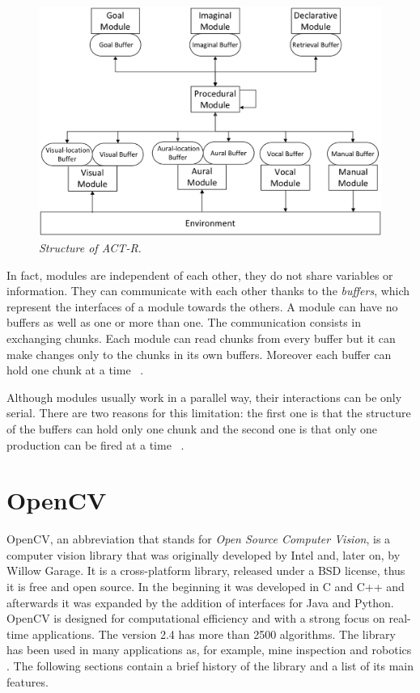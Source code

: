	\begin{figure}[h]
	  \begin{center} 
	    \includegraphics[scale=0.25]{images/ch_01/actr.eps}
	  \end{center} 
	  \caption{\textit{Structure of ACT-R.}}  
	  \label{fig:modulesActr}
	\end{figure}
	
	
	In fact, modules are independent of each other, they do not share variables or information. They can communicate with each other thanks to the \emph{buffers}, which represent the interfaces of a module towards the others. A module can have no buffers as well as one or more than one. The communication consists in exchanging chunks. Each module can read chunks from every buffer but it can make changes only to the chunks in its own buffers. Moreover each buffer can hold one chunk at a time ~\cite{actr6refman}. 

	Although modules usually work in a parallel way, their interactions can be only serial.
	There are two reasons for this limitation: the first one is that the structure of the buffers can hold only one chunk and the second one is that only one production can be fired at a time ~\cite{actr6refman}.
	
	
  \section{OpenCV}
	\mbox{OpenCV}, an abbreviation that stands for \emph{Open Source Computer Vision}, is a computer vision library that was originally developed by Intel and, later on, by Willow Garage.
	It is a cross-platform library, released under a BSD license, thus it is free and open source. In the beginning it was developed in C and C++ and afterwards it was expanded by the addition of interfaces for Java and Python. \mbox{OpenCV} is designed for computational efficiency and with a strong focus on real-time applications. The version 2.4 has more than 2500 algorithms. The library has been used in many applications as, for example, mine inspection and robotics \cite{OpenCV:MainWebPage}. The following sections contain a brief history of the library and a list of its main features.
		
